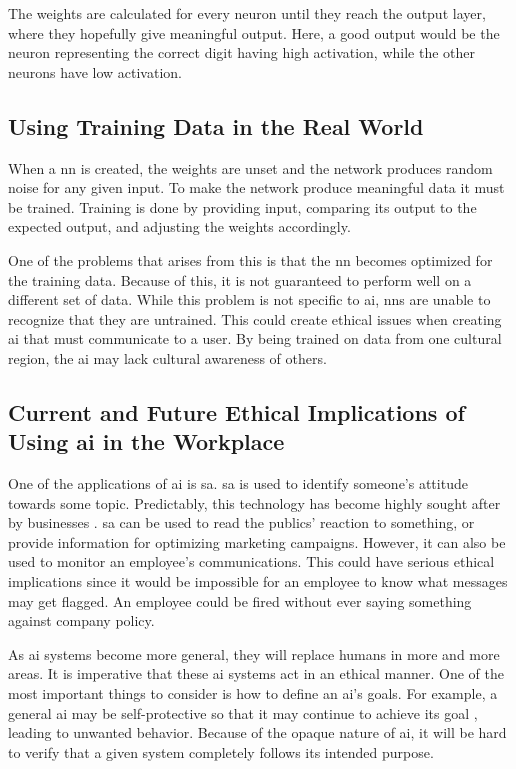 \documentclass{report}
\begin{document}
The weights are calculated for every neuron until they reach the output layer, where they hopefully give meaningful output.
Here, a good output would be the neuron representing the correct digit having high activation, while the other neurons have low activation.

\subsection{Using Training Data in the Real World}
When a \ac{nn} is created, the weights are unset and the network produces random noise for any given input.
To make the network produce meaningful data it must be trained.
Training is done by providing input, comparing its output to the expected output, and adjusting the weights accordingly\footnotemark.

One of the problems that arises from this is that the \ac{nn} becomes optimized for the training data.
Because of this, it is not guaranteed to perform well on a different set of data\citep{amodei2016}. 
While this problem is not specific to \ac{ai}\footnotemark, \acp{nn} are unable to recognize that they are untrained.
This could create ethical issues when creating \ac{ai} that must communicate to a user.
By being trained on data from one cultural region, the \ac{ai} may lack cultural awareness of others.

\subsection{Current and Future Ethical Implications of Using \ac{ai} in the Workplace}
One of the applications of \ac{ai} is \ac{sa}.
\ac{sa} is used to identify someone's attitude towards some topic.
Predictably, this technology has become highly sought after by businesses \citep{alexandra2014}.
\Ac{sa} can be used to read the publics' reaction to something, or provide information for optimizing marketing campaigns.
However, it can also be used to monitor an employee's communications.
This could have serious ethical implications since it would be impossible for an employee to know what messages may get flagged.
An employee could be fired without ever saying something against company policy.

As \ac{ai} systems become more general, they will replace humans in more and more areas.
It is imperative that these \ac{ai} systems act in an ethical manner.
One of the most important things to consider is how to define an \ac{ai}'s goals.
For example, a general \ac{ai} may be self-protective so that it may continue to achieve its goal \citep{omohundro2014}, leading to unwanted behavior.
Because of the opaque nature of \ac{ai}, it will be hard to verify that a given system completely follows its intended purpose.
\newpage %
\end{document}

